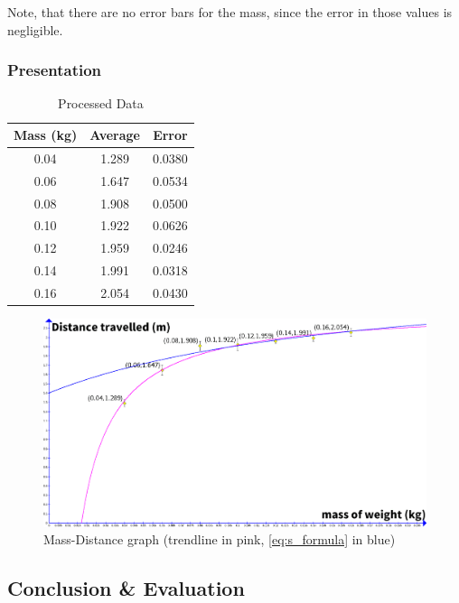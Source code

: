 \documentclass[titlepage,12pt]{article}
\begin{document}
Note, that there are no error bars for the mass, since the error in those values is
negligible.

\subsubsection{Presentation}

\FloatBarrier
\begin{table}[H]
    \centering
    \def\arraystretch{1.5}
    \begin{tabular}{c|c|c}
        Mass (kg) & Average & Error\\ 
        \hline
        \hline
        0.04 & 1.289 & 0.0380\\ 
        \hline
        0.06 & 1.647 & 0.0534\\ 
        \hline
        0.08 & 1.908 & 0.0500\\ 
        \hline
        0.10 & 1.922 & 0.0626\\ 
        \hline
        0.12 & 1.959 & 0.0246\\ 
        \hline
        0.14 & 1.991 & 0.0318\\ 
        \hline
        0.16 & 2.054 & 0.0430\\ 
    \end{tabular}
    \caption{Processed Data} 
    \label{table:processed data}
\end{table}

\begin{figure}[H]
    \label{fig:mass-distance-graph}
    \centering
    \includegraphics[scale=0.28]{mass-distance_graph}
    \caption{Mass-Distance graph (trendline in pink, 
        \autoref{eq:s_formula} in blue)}
\end{figure}

\FloatBarrier

\subsection{Conclusion \& Evaluation}
\end{document}
